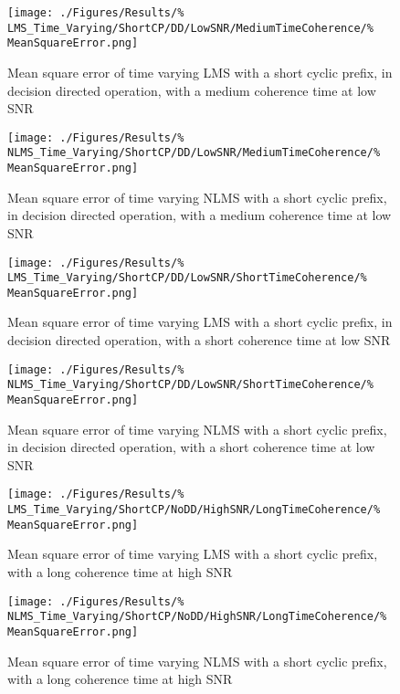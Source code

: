 \begin{figure}[ht]
	\centering
	\begin{minipage}{0.49\textwidth}
		\centering
		\texttt{[image: ./Figures/Results/\%
	LMS\_Time\_Varying/ShortCP/DD/LowSNR/MediumTimeCoherence/\%
	MeanSquareError.png]}
		\captionsetup{width=0.75\linewidth}
		\caption{Mean square error of time varying LMS with a 
		short cyclic prefix, in decision directed operation, 
		with a medium coherence time at low SNR}
	\end{minipage}
	\begin{minipage}{0.49\textwidth}
		\centering
		\texttt{[image: ./Figures/Results/\%
	NLMS\_Time\_Varying/ShortCP/DD/LowSNR/MediumTimeCoherence/\%
	MeanSquareError.png]}
		\captionsetup{width=0.75\linewidth}
		\caption{Mean square error of time varying NLMS with 
		a short cyclic prefix, in decision directed 
		operation, with a medium coherence time at low SNR}
	\end{minipage}
\end{figure}

\begin{figure}[ht]
	\centering
	\begin{minipage}{0.49\textwidth}
		\centering
		\texttt{[image: ./Figures/Results/\%
	LMS\_Time\_Varying/ShortCP/DD/LowSNR/ShortTimeCoherence/\%
	MeanSquareError.png]}
		\captionsetup{width=0.75\linewidth}
		\caption{Mean square error of time varying LMS with a 
		short cyclic prefix, in decision directed operation, 
		with a short coherence time at low SNR}
	\end{minipage}
	\begin{minipage}{0.49\textwidth}
		\centering
		\texttt{[image: ./Figures/Results/\%
	NLMS\_Time\_Varying/ShortCP/DD/LowSNR/ShortTimeCoherence/\%
	MeanSquareError.png]}
		\captionsetup{width=0.75\linewidth}
		\caption{Mean square error of time varying NLMS with 
		a short cyclic prefix, in decision directed 
		operation, with a short coherence time at low SNR}
	\end{minipage}
\end{figure}

\begin{figure}[ht]
	\centering
	\begin{minipage}{0.49\textwidth}
		\centering
		\texttt{[image: ./Figures/Results/\%
	LMS\_Time\_Varying/ShortCP/NoDD/HighSNR/LongTimeCoherence/\%
	MeanSquareError.png]}
		\captionsetup{width=0.75\linewidth}
		\caption{Mean square error of time varying LMS with a 
		short cyclic prefix, with a long coherence time at 
		high SNR}
	\end{minipage}
	\begin{minipage}{0.49\textwidth}
		\centering
		\texttt{[image: ./Figures/Results/\%
	NLMS\_Time\_Varying/ShortCP/NoDD/HighSNR/LongTimeCoherence/\%
	MeanSquareError.png]}
		\captionsetup{width=0.75\linewidth}
		\caption{Mean square error of time varying NLMS with 
		a short cyclic prefix, with a long coherence time at 
		high SNR}
	\end{minipage}
\end{figure}

